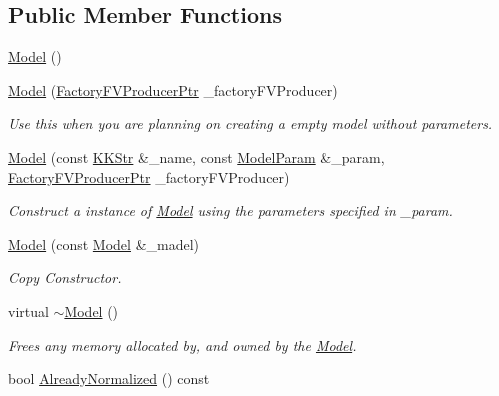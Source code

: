\subsection*{Public Member Functions}
\begin{DoxyCompactItemize}
\item 
\hyperlink{class_k_k_m_l_l_1_1_model_ae3b375de5f6df4faf74a95d64748e048}{Model} ()
\item 
\hyperlink{class_k_k_m_l_l_1_1_model_a9074bdc6ad1d45cdfd4455945151787e}{Model} (\hyperlink{namespace_k_k_m_l_l_a82812d1feb85a6cff72d059bc67bb90e}{Factory\+F\+V\+Producer\+Ptr} \+\_\+factory\+F\+V\+Producer)
\begin{DoxyCompactList}\small\item\em Use this when you are planning on creating a empty model without parameters. \end{DoxyCompactList}\item 
\hyperlink{class_k_k_m_l_l_1_1_model_a7c718474ce498b1b1258dd8c195a0f30}{Model} (const \hyperlink{class_k_k_b_1_1_k_k_str}{K\+K\+Str} \&\+\_\+name, const \hyperlink{class_k_k_m_l_l_1_1_model_param}{Model\+Param} \&\+\_\+param, \hyperlink{namespace_k_k_m_l_l_a82812d1feb85a6cff72d059bc67bb90e}{Factory\+F\+V\+Producer\+Ptr} \+\_\+factory\+F\+V\+Producer)
\begin{DoxyCompactList}\small\item\em Construct a instance of \textquotesingle{}\hyperlink{class_k_k_m_l_l_1_1_model}{Model}\textquotesingle{} using the parameters specified in \textquotesingle{}\+\_\+param\textquotesingle{}. \end{DoxyCompactList}\item 
\hyperlink{class_k_k_m_l_l_1_1_model_a7872df78ae8debfb15dd976b3a660551}{Model} (const \hyperlink{class_k_k_m_l_l_1_1_model}{Model} \&\+\_\+madel)
\begin{DoxyCompactList}\small\item\em Copy Constructor. \end{DoxyCompactList}\item 
virtual \hyperlink{class_k_k_m_l_l_1_1_model_ad6ebd2062a0b823db841a0b88baac4c0}{$\sim$\+Model} ()
\begin{DoxyCompactList}\small\item\em Frees any memory allocated by, and owned by the \hyperlink{class_k_k_m_l_l_1_1_model}{Model}. \end{DoxyCompactList}\item 
bool \hyperlink{class_k_k_m_l_l_1_1_model_ae504ea68386c539350cbc6a3ac8fd067}{Already\+Normalized} () const 

\end{DoxyCompactItemize}
